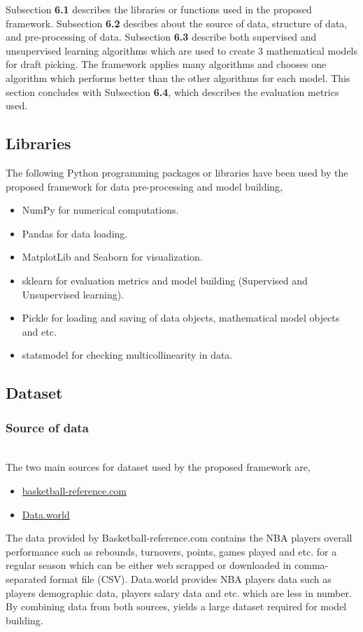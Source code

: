 \documentclass[format=sigconf]{acmart}
\begin{document}
Subsection \textbf{6.1} describes the libraries or functions used in the proposed framework. Subsection \textbf{6.2} descibes about the 
source of data, structure of data, and pre-processing of data. Subsection \textbf{6.3} describe both supervised and unsupervised 
learning algorithms which are used to create 3 mathematical models for draft picking. The framework applies many algorithms and 
chooses one algorithm which performs better than the other algorithms for each model. This section concludes with 
Subsection \textbf{6.4}, which describes the evaluation metrics used.

\subsection{Libraries}
The following Python programming packages or libraries have been used by the proposed framework for data pre-processing and model building,
\begin{itemize}
    \item NumPy for numerical computations.
    \item Pandas for data loading.
    \item MatplotLib and Seaborn for visualization.
    \item sklearn for evaluation metrics and model building (Supervised and Unsupervised learning).
    \item Pickle for loading and saving of data objects, mathematical model objects and etc.
    \item statsmodel for checking  multicollinearity in data.
\end{itemize}
\subsection{Dataset}
\subsubsection{Source of data}
\hfill\\
The two main sources for dataset used by the proposed framework are,
\begin{itemize}
    \item \href{https://www.basketball-reference.com/}{basketball-reference.com}
    \item \href{https://data.world/}{Data.world}
\end{itemize}
\par
The data provided by Basketball-reference.com contains the NBA players overall performance such as rebounds, turnovers, points, games 
played and etc. for a regular season which can be either web scrapped or downloaded in comma-separated format file (CSV). Data.world
provides NBA players data such as players demographic data, players salary data and etc. which are less in number. By combining data
from both sources, yields a large dataset required for model building.
\end{document}
